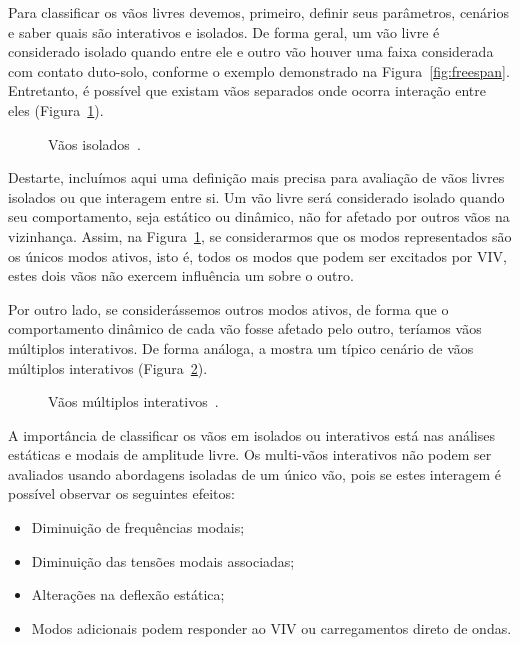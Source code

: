 Para classificar os vãos livres devemos, primeiro, definir seus parâmetros, cenários e saber quais são interativos e isolados.
De forma geral, um vão livre é considerado isolado quando entre ele e outro vão houver uma faixa considerada com contato duto-solo, conforme o exemplo demonstrado na Figura~\ref{fig:freespan}.
Entretanto, é possível que existam vãos separados onde ocorra interação entre eles (Figura~\ref{fig:viv-vaoisoint}).

\begin{figure}[hbt!]
\begin{center}
\caption{Vãos isolados~\cite{DNV2017}.}
\label{fig:viv-vaoisoint}
\end{center}
\end{figure}

Destarte, incluímos aqui uma definição mais precisa para avaliação de vãos livres isolados ou que interagem entre si.
Um vão livre será considerado isolado quando seu comportamento, seja estático ou dinâmico, não for afetado por outros vãos na vizinhança.
Assim, na Figura~\ref{fig:viv-vaoisoint}, se considerarmos que os modos representados são os únicos modos ativos, isto é, todos os modos que podem ser excitados por VIV, estes dois vãos não exercem influência um sobre o outro.

Por outro lado, se considerássemos outros modos ativos, de forma que o comportamento dinâmico de cada vão fosse afetado pelo outro, teríamos vãos múltiplos interativos.
De forma análoga, a  mostra um típico cenário de vãos múltiplos interativos (Figura~\ref{fig:viv-vaomult}).

\begin{figure}[hbt!]
\begin{center}
\caption{Vãos múltiplos interativos~\cite{DNV2017}.}
\label{fig:viv-vaomult}
\end{center}
\end{figure}

A importância de classificar os vãos em isolados ou interativos está nas análises estáticas e modais de amplitude livre.
Os multi-vãos interativos não podem ser avaliados usando abordagens isoladas de um único vão, pois se estes interagem é possível observar os seguintes efeitos:

	\begin{itemize}
		\item Diminuição de frequências modais;
		\item Diminuição das tensões modais associadas;
		\item Alterações na deflexão estática;
		\item Modos adicionais podem responder ao VIV ou carregamentos direto de ondas.
	\end{itemize}

